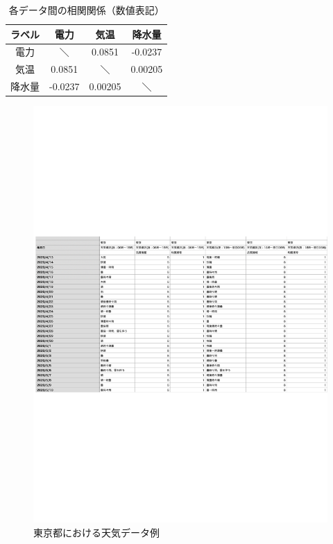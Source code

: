 \begin{table}[!t]
\centering
  \caption{各データ間の相関関係（数値表記）}
  \begin{tabular}{|c|c|c|c|} \hline
    ラベル & 電力 & 気温 & 降水量 \\ \hline
    電力 & ＼ & 0.0851 & -0.0237 \\ \hline
    気温 & 0.0851 & ＼ & 0.00205 \\ \hline
    降水量 & -0.0237 & 0.00205 & ＼ \\ \hline 
  \end{tabular}
\end{table}
\begin{figure}[phb]
\centering
\includegraphics[scale=0.8]{exe_wether.pdf}
\caption{東京都における天気データ例}
\end{figure}

